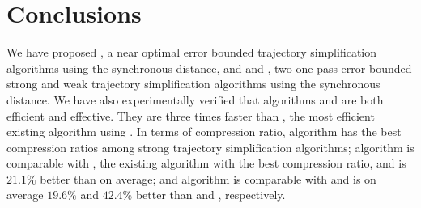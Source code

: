 \vspace{-1ex}
\section{Conclusions} %
\label{sec-conclusion}

We have proposed \cisto, a near optimal error bounded trajectory simplification algorithms using the  synchronous distance,  and \cist and \cista, two one-pass error bounded strong and weak trajectory simplification algorithms using the synchronous distance.
We have also experimentally verified that algorithms \cist and \cista are both efficient and effective.
They are three times faster than \squishe, the most efficient existing \lsa algorithm using \sed.
%
In terms of compression ratio, 
algorithm \cisto has the best compression ratios among strong trajectory simplification algorithms;
algorithm \cist is {comparable} with \dps, the existing \lsa algorithm with the best compression ratio, and is $21.1\%$ better than \squishe on average; and 
algorithm \cista is comparable with \cisto and is on average $19.6\%$ and $42.4\%$ better than \dps and \squishe, respectively.
